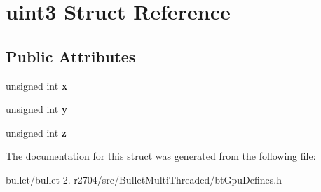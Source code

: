 \hypertarget{structuint3}{\section{uint3 Struct Reference}
\label{structuint3}
}
\subsection*{Public Attributes}
\begin{DoxyCompactItemize}
\item 
\hypertarget{structuint3_ae5e53a2c212b95e0425bc11c591bf5f3}{unsigned int {\bfseries x}}\label{structuint3_ae5e53a2c212b95e0425bc11c591bf5f3}

\item 
\hypertarget{structuint3_a46416386666d0bfd98c6dff811353cca}{unsigned int {\bfseries y}}\label{structuint3_a46416386666d0bfd98c6dff811353cca}

\item 
\hypertarget{structuint3_a5c811d4e09ad664f1ee19cbe51da3b3e}{unsigned int {\bfseries z}}\label{structuint3_a5c811d4e09ad664f1ee19cbe51da3b3e}

\end{DoxyCompactItemize}


The documentation for this struct was generated from the following file\+:\begin{DoxyCompactItemize}
\item 
bullet/bullet-\/2.-\/r2704/src/\+Bullet\+Multi\+Threaded/bt\+Gpu\+Defines.\+h\end{DoxyCompactItemize}

